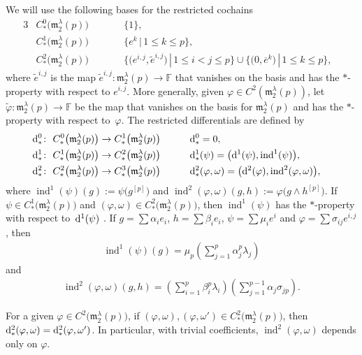 \documentclass[pdftex]{sigma}
\def\ind{\operatorname{ind}}
\def\phi{\varphi}
\def\m{\mathfrak m}
\def\F{\mathbb F}
\numberwithin{equation}{section}
\begin{document}
We will use the following bases for the restricted cochains
\begin{alignat*}{3}
& C^0_*\big(\m_2^\lambda(p)\big) \qquad && \{1\},&\\
& C^1_*\big(\m_2^\lambda(p)\big)\qquad & & \big\{e^k\, |\, 1\le k\le p\big\},&\\
& C^2_*\big(\m_2^\lambda(p)\big)\qquad & & \big\{\big(e^{i,j},\tilde e^{i,j}\big)\, |\, 1\le i<j\le p\big\}\cup \big\{\big(0,\overline e^k\big)\, |\, 1\le k\le p\big\},&
\end{alignat*}
where $\tilde e^{i,j}$ is the map $\tilde e^{i,j}\colon \m_2^\lambda(p)\to \F$ that vanishes on the basis and has the $*$-property with respect to $e^{i,j}$. More generally, given $\phi\in C^2(\m_2^\lambda(p))$, let $\tilde\phi\colon \m_2^\lambda(p) \to\F$ be the map that vanishes on the basis for $\m_2^\lambda(p) $ and has the $*$-property with respect to~$\phi$. The restricted differentials are defined by
\begin{alignat*}{3}
& {\rm d}^0_*\colon \ C^0_*\big(\m_2^\lambda(p)\big)\to C^1_*\big(\m_2^\lambda(p)\big) \qquad && {\rm d}^0_*=0,&\\
& {\rm d}^1_*\colon \ C^1_*\big(\m_2^\lambda(p)\big)\to C^2_*\big(\m_2^\lambda(p)\big) \qquad && {\rm d}^1_*(\psi)=\big({\rm d}^1(\psi),\ind^1(\psi)\big),&\\
& {\rm d}^2_*\colon \ C^2_*\big(\m_2^\lambda(p)\big)\to C^3_*\big(\m_2^\lambda(p)\big) \qquad && {\rm d}^2_*(\phi,\omega)=\big({\rm d}^2(\phi),\ind^2(\phi,\omega)\big),&
\end{alignat*}
where $\ind^1(\psi)(g) := \psi\big(g^{[p]}\big)$ and $\ind^2(\phi,\omega)(g,h) := \phi\big(g\wedge h^{[p]}\big)$. If $\psi\in C^1_*\big(\m_2^\lambda(p)\big)$ and $(\phi,\omega)\in C^2_*\big(\m_2^\lambda(p)\big)$, then $\ind^1(\psi)$ has the $*$-property with respect to~${\rm d}^1(\psi)$ \cite[Lemma~4]{EvansFuchs2008}. If $g=\sum\alpha_i e_i$, $h=\sum\beta_i e_i$, $\psi=\sum \mu_ie^i$ and $\phi=\sum \sigma_{ij}e^{i,j}$, then
\begin{gather*}%
 \ind^1(\psi)(g) = \mu_p \left (\sum_{j=1}^p \alpha_j^p\lambda_j \right )
\end{gather*}
and
\begin{gather}\label{induced2}
 \ind^2(\phi,\omega)(g,h) = \left (\sum_{i=1}^p \beta_i^p\lambda_i \right )\left (\sum_{j=1}^{p-1} \alpha_j\sigma_{jp}\right).
\end{gather}

\begin{Remark}\label{changecomp2}
 For a given $\phi\in C^2\big(\m_2^\lambda(p)\big)$, if $(\phi,\omega),(\phi,\omega')\in C^2_*\big(\m_2^\lambda(p)\big)$, then ${\rm d}^2_*(\phi,\omega)={\rm d}^2_*(\phi,\omega')$. In particular, with trivial coefficients, $\ind^2(\phi,\omega)$ depends only on $\phi$.
\end{Remark}
\end{document}
